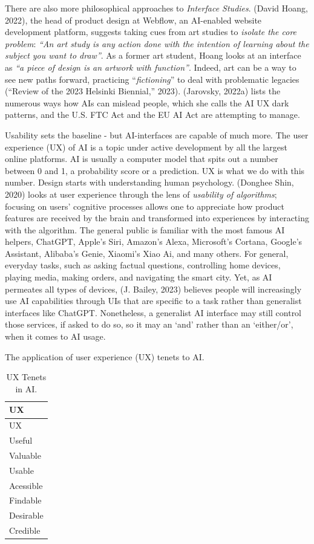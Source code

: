 \documentclass[
  12pt,
  letterpaper,
  DIV=11,
  numbers=noendperiod]{scrartcl}
\begin{document}
There are also more philosophical approaches to \emph{Interface
Studies}. (David Hoang, 2022), the head of product design at Webflow, an
AI-enabled website development platform, suggests taking cues from art
studies to \emph{isolate the core problem}: \emph{``An art study is any
action done with the intention of learning about the subject you want to
draw''}. As a former art student, Hoang looks at an interface as
\emph{``a piece of design is an artwork with function''}. Indeed, art
can be a way to see new paths forward, practicing ``\emph{fictioning}''
to deal with problematic legacies ({``Review of the 2023 {Helsinki
Biennial},''} 2023). (Jarovsky, 2022a) lists the numerous ways how AIs
can mislead people, which she calls the AI UX dark patterns, and the
U.S. FTC Act and the EU AI Act are attempting to manage.

Usability sets the baseline - but AI-interfaces are capable of much
more. The user experience (UX) of AI is a topic under active development
by all the largest online platforms. AI is usually a computer model that
spits out a number between 0 and 1, a probability score or a prediction.
UX is what we do with this number. Design starts with understanding
human psychology. (Donghee Shin, 2020) looks at user experience through
the lens of \emph{usability of algorithms}; focusing on users' cognitive
processes allows one to appreciate how product features are received by
the brain and transformed into experiences by interacting with the
algorithm. The general public is familiar with the most famous AI
helpers, ChatGPT, Apple's Siri, Amazon's Alexa, Microsoft's Cortana,
Google's Assistant, Alibaba's Genie, Xiaomi's Xiao Ai, and many others.
For general, everyday tasks, such as asking factual questions,
controlling home devices, playing media, making orders, and navigating
the smart city. Yet, as AI permeates all types of devices, (J. Bailey,
2023) believes people will increasingly use AI capabilities through UIs
that are specific to a task rather than generalist interfaces like
ChatGPT. Nonetheless, a generalist AI interface may still control those
services, if asked to do so, so it may an `and' rather than an
`either/or', when it comes to AI usage.

The application of user experience (UX) tenets to AI.

\def\pandoctableshortcapt{UX Tenets in AI}

\begin{longtable}[]{@{}l@{}}
\caption[UX Tenets in AI]{UX Tenets in AI.}\tabularnewline
\toprule\noalign{}
UX \\
\midrule\noalign{}
\endfirsthead
\toprule\noalign{}
UX \\
\midrule\noalign{}
\endhead
\bottomrule\noalign{}
\endlastfoot
Useful \\
Valuable \\
Usable \\
Acessible \\
Findable \\
Desirable \\
Credible \\
\end{longtable}
\end{document}
